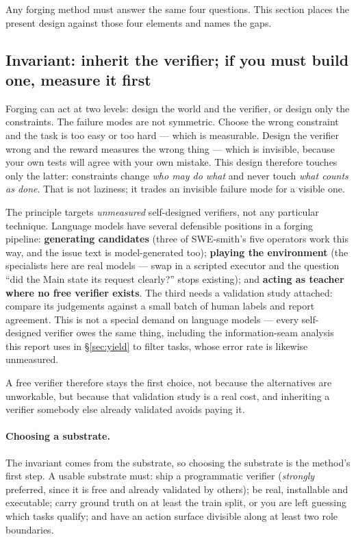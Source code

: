 \documentclass[11pt,a4paper]{article}
\begin{document}
Any forging method must answer the same four questions. This section places the present design against those four elements and names the gaps.

\subsection{Invariant: inherit the verifier; if you must build one, measure it first}
\label{sec:invariant}

Forging can act at two levels: design the world and the verifier, or design only the constraints. The failure modes are not symmetric. Choose the wrong constraint and the task is too easy or too hard --- which is measurable. Design the verifier wrong and the reward measures the wrong thing --- which is invisible, because your own tests will agree with your own mistake. This design therefore touches only the latter: constraints change \emph{who may do what} and never touch \emph{what counts as done}. That is not laziness; it trades an invisible failure mode for a visible one.

The principle targets \emph{unmeasured} self-designed verifiers, not any particular technique. Language models have several defensible positions in a forging pipeline: \textbf{generating candidates} (three of SWE-smith's five operators work this way, and the issue text is model-generated too); \textbf{playing the environment} (the specialists here are real models --- swap in a scripted executor and the question ``did the Main state its request clearly?'' stops existing); and \textbf{acting as teacher where no free verifier exists}. The third needs a validation study attached: compare its judgements against a small batch of human labels and report agreement. This is not a special demand on language models --- every self-designed verifier owes the same thing, including the information-seam analysis this report uses in \S\ref{sec:yield} to filter tasks, whose error rate is likewise unmeasured.

A free verifier therefore stays the first choice, not because the alternatives are unworkable, but because that validation study is a real cost, and inheriting a verifier somebody else already validated avoids paying it.

\paragraph{Choosing a substrate.}
The invariant comes from the substrate, so choosing the substrate is the method's first step. A usable substrate must: ship a programmatic verifier (\emph{strongly} preferred, since it is free and already validated by others); be real, installable and executable; carry ground truth on at least the train split, or you are left guessing which tasks qualify; and have an action surface divisible along at least two role boundaries.
\end{document}
